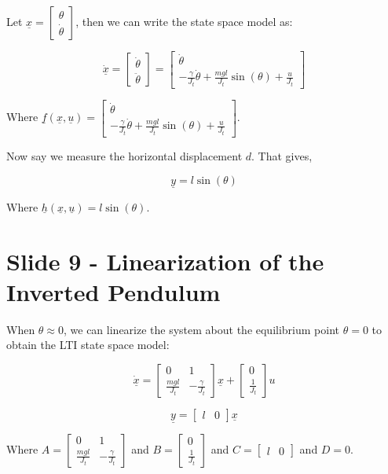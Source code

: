 \documentclass[
  letterpaper,
  DIV=11,
  numbers=noendperiod]{scrreprt}
\begin{document}
Let
\(\underline{x} = \begin{bmatrix} \theta \\ \dot{\theta} \end{bmatrix}\),
then we can write the state space model as:

\[ \dot{\underline{x}} = \begin{bmatrix} \dot{\theta} \\ \ddot{\theta} \end{bmatrix} = \begin{bmatrix} \dot{\theta} \\ -\frac{\gamma}{J_t}\dot{\theta} + \frac{mgl}{J_t}\sin(\theta) + \frac{u}{J_t} \end{bmatrix} \]

Where
\(\underline{f}(\underline{x},\underline{u}) = \begin{bmatrix} \dot{\theta} \\ -\frac{\gamma}{J_t}\dot{\theta} + \frac{mgl}{J_t}\sin(\theta) + \frac{u}{J_t} \end{bmatrix}\).

Now say we measure the horizontal displacement \(d\). That gives,

\[\underline{y} = l\sin(\theta)\]

Where \(\underline{h}(\underline{x},\underline{u}) = l\sin(\theta)\).

\section{Slide 9 - Linearization of the Inverted
Pendulum}\label{slide-9---linearization-of-the-inverted-pendulum}

When \(\theta \approx 0\), we can linearize the system about the
equilibrium point \(\theta = 0\) to obtain the LTI state space model:

\[\dot{\underline{x}} = \begin{bmatrix} 0 & 1 \\ \frac{mgl}{J_t} & -\frac{\gamma}{J_t} \end{bmatrix} \underline{x} + \begin{bmatrix} 0 \\ \frac{1}{J_t} \end{bmatrix} u\]

\[\underline{y} = \begin{bmatrix} l & 0 \end{bmatrix} \underline{x}\]

Where
\(A = \begin{bmatrix} 0 & 1 \\ \frac{mgl}{J_t} & -\frac{\gamma}{J_t} \end{bmatrix}\)
and \(B = \begin{bmatrix} 0 \\ \frac{1}{J_t} \end{bmatrix}\) and
\(C = \begin{bmatrix} l & 0 \end{bmatrix}\) and \(D = 0\).
\end{document}
